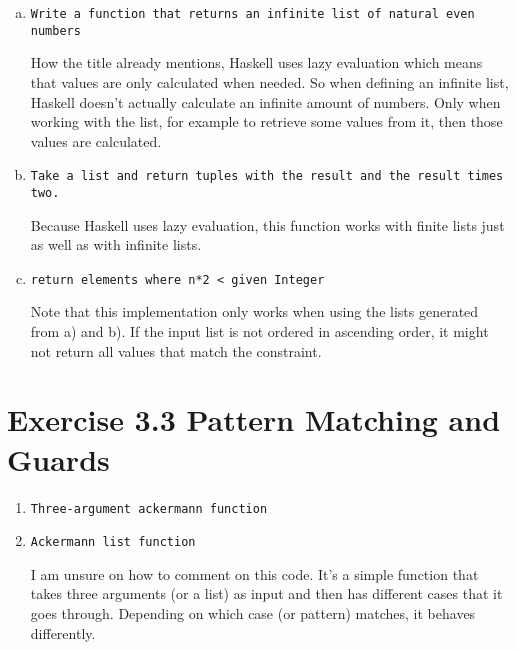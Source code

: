 \documentclass{article} %
\newcommand{\homeworkNumber}{3} %
\begin{document}
\begin{enumerate}[a)]
\item \verb|Write a function that returns an infinite list of natural even numbers|\\
\lstset{language=Haskell}


How the title already mentions, Haskell uses lazy evaluation which means that values are only calculated when needed. So when defining an infinite list, Haskell doesn't actually calculate an infinite amount of numbers. Only when working with the list, for example to retrieve some values from it, then those values are calculated.\\

\item \verb|Take a list and return tuples with the result and the result times two.|\\
\lstset{language=Haskell}


Because Haskell uses lazy evaluation, this function works with finite lists just as well as with infinite lists.\\

\item \verb|return elements where n*2 < given Integer|\\
\lstset{language=Haskell}


Note that this implementation only works when using the lists generated from a) and b). If the input list is not ordered in ascending order, it might not return all values that match the constraint.

\end{enumerate}

\clearpage
\section*{Exercise \homeworkNumber.3 Pattern Matching and Guards}

\begin{enumerate}
\item \verb|Three-argument ackermann function|\\
\lstset{language=Haskell}


\item \verb|Ackermann list function|\\
\lstset{language=Haskell}


I am unsure on how to comment on this code. It's a simple function that takes three arguments (or a list) as input and then has different cases that it goes through. Depending on which case (or pattern) matches, it behaves differently.
\end{enumerate}
\end{document}
